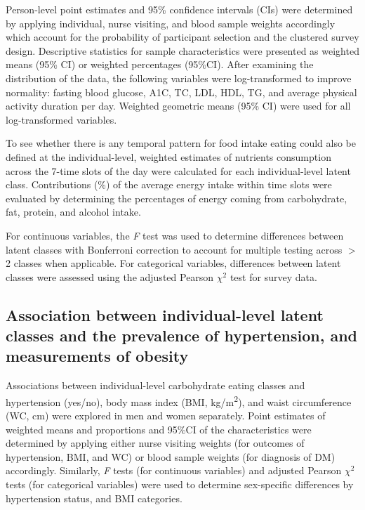 Person-level point estimates and 95\% confidence intervals (CIs) were determined by applying individual, nurse visiting, and blood sample weights accordingly which account for the probability of participant selection and the clustered survey design. Descriptive statistics for sample characteristics were presented as weighted means (95\% CI) or weighted percentages (95\%CI). After examining the distribution of the data, the following variables were log-transformed to improve normality: fasting blood glucose, A1C, TC, LDL, HDL, TG, and average physical activity duration per day. Weighted geometric means (95\% CI) were used for all log-transformed variables. 

To see whether there is any temporal pattern for food intake eating could also be defined at the individual-level, weighted estimates of nutrients consumption across the 7-time slots of the day were calculated for each individual-level latent class. Contributions (\%) of the average energy intake within time slots were evaluated by determining the percentages of energy coming from carbohydrate, fat, protein, and alcohol intake. 

For continuous variables, the \textit{F} test was used to determine differences between latent classes with Bonferroni correction to account for multiple testing across $>$ 2 classes when applicable. For categorical variables, differences between latent classes were assessed using the adjusted Pearson $\chi^2$ test for survey data.\vspace{-0.5cm}


\subsection{Association between individual-level latent classes and the prevalence of hypertension, and measurements of obesity}\vspace{-0.3cm}


Associations between individual-level carbohydrate eating classes and hypertension (yes/no), body mass index (BMI, kg/m\textsuperscript{2}), and waist circumference (WC, cm) were explored in men and women separately. Point estimates of weighted means and proportions and 95\%CI of the characteristics were determined by applying either nurse visiting weights (for outcomes of hypertension, BMI, and WC) or blood sample weights (for diagnosis of DM) accordingly. Similarly, \textit{F} tests (for continuous variables) and adjusted Pearson $\chi^2$ tests (for categorical variables) were used to determine sex-specific differences by hypertension status, and BMI categories. 

